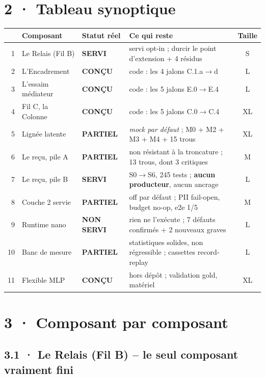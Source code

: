 \documentclass[10pt]{article}
\newcommand{\ok}{{\color{green}\textbf{SERVI}}}
\newcommand{\partiel}{{\color{amber}\textbf{PARTIEL}}}
\newcommand{\design}{{\color{grey}\textbf{CONÇU}}}
\newcommand{\nope}{{\color{red}\textbf{NON SERVI}}}
\newcommand{\sz}[1]{{\small\color{grey}\textsf{#1}}}
\begin{document}
\section{2 · Tableau synoptique}

\renewcommand{\arraystretch}{1.12}
\begin{center}\small
\begin{tabular}{@{}rl l >{\raggedright\arraybackslash}p{8.1cm}c@{}}
\toprule
& \textbf{Composant} & \textbf{Statut réel} & \textbf{Ce qui reste} & \textbf{Taille} \\
\midrule
1 & Le Relais (Fil B) & \ok & servi opt-in ; durcir le point d'extension + 4 résidus & \sz{S} \\
2 & L'Encadrement & \design & 0 code : les 4 jalons C.1.a$\rightarrow$d & \sz{L} \\
3 & L'essaim médiateur & \design & 0 code : les 5 jalons E.0$\rightarrow$E.4 & \sz{L} \\
4 & Fil C, la Colonne & \design & 0 code : les 5 jalons C.0$\rightarrow$C.4 & \sz{XL} \\
5 & Lignée latente & \partiel & \emph{mock par défaut} ; M0 + M2 + M3 + M4 + 15 trous & \sz{XL} \\
6 & Le reçu, pile A & \partiel & non résistant à la troncature ; 13 trous, dont 3 critiques & \sz{M} \\
7 & Le reçu, pile B & \ok & S0$\rightarrow$S6, 245 tests ; \textbf{aucun producteur}, aucun ancrage & \sz{L} \\
8 & Couche 2 servie & \partiel & off par défaut ; PII fail-open, budget no-op, e2e 1/5 & \sz{M} \\
9 & Runtime nano & \nope & rien ne l'exécute ; 7 défauts confirmés + 2 nouveaux graves & \sz{L} \\
10 & Banc de mesure & \partiel & statistiques solides, non régressible ; cassettes record-replay & \sz{L} \\
11 & Flexible MLP & \design & hors dépôt ; validation gold, matériel & \sz{XL} \\
\bottomrule
\end{tabular}
\end{center}

\section{3 · Composant par composant}

\subsection{3.1 · Le Relais (Fil B) -- le seul composant vraiment fini}
\end{document}
